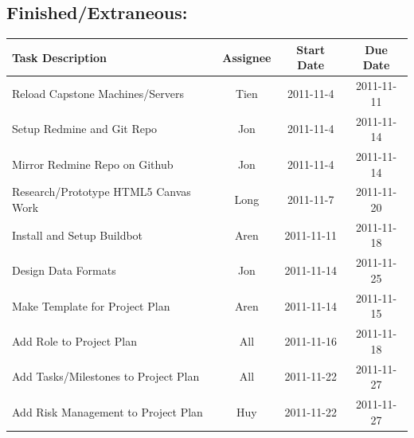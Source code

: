 \documentclass[12pt, letterpaper]{article}
\begin{document}
	\subsection{Finished/Extraneous:}

  \begin{center}
    \begin{tabular}{| p{8.3cm} || c | c | c | }
      \hline
      Task Description & Assignee & Start Date & Due Date \\
      \hline
			Reload Capstone Machines/Servers & Tien & 2011-11-4 & 2011-11-11\\
			Setup Redmine and Git Repo & Jon & 2011-11-4 & 2011-11-14 \\
			Mirror Redmine Repo on Github & Jon & 2011-11-4 & 2011-11-14 \\
			Research/Prototype HTML5 Canvas Work & Long & 2011-11-7 & 2011-11-20 \\
      Install and Setup Buildbot & Aren & 2011-11-11 & 2011-11-18 \\
            Design Data Formats & Jon & 2011-11-14 & 2011-11-25 \\
      Make Template for Project Plan & Aren & 2011-11-14 & 2011-11-15 \\
			Add Role to Project Plan & All & 2011-11-16 & 2011-11-18 \\
			Add Tasks/Milestones to Project Plan & All & 2011-11-22 & 2011-11-27\\
			Add Risk Management to Project Plan & Huy & 2011-11-22 & 2011-11-27\\
      \hline
    \end{tabular}
  \end{center}
\end{document}
